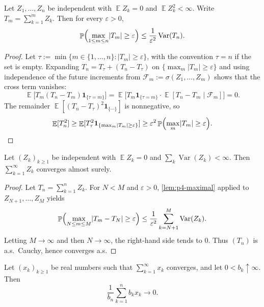 \documentclass[11pt,a4paper]{article}
\DeclareMathOperator{\Var}{Var}
\DeclareMathOperator{\E}{\mathbb{E}}
\DeclareMathOperator{\Pbb}{\mathbb{P}}
\begin{document}
\begin{lemma}
\label{lem:p4-maximal}
Let \(Z_1,\dots,Z_n\) be independent with \(\E Z_k=0\) and \(\E Z_k^2<\infty\). Write \(T_m=\sum_{k=1}^m Z_k\). Then for every \(\varepsilon>0\),
\[
\Pbb\Bigl(\max_{1\le m\le n}\lvert T_m\rvert\ge\varepsilon\Bigr)
\le
\frac{1}{\varepsilon^2}\Var(T_n).
\]
\end{lemma}

\begin{proof}
Let \(\tau:=\min\{m\in\{1,\dots,n\}:\lvert T_m\rvert\ge\varepsilon\}\), with the convention \(\tau=n\) if the set is empty. Expanding \(T_n=T_\tau+(T_n-T_\tau)\) on \(\{\max_m\lvert T_m\rvert\ge\varepsilon\}\) and using independence of the future increments from \(\mathcal{F}_m:=\sigma(Z_1,\dots,Z_m)\) shows that the cross term vanishes:
\[
\E\bigl[T_m(T_n-T_m)\mathbf{1}_{\{\tau=m\}}\bigr]
=
\E\bigl[T_m\mathbf{1}_{\{\tau=m\}}\cdot\E[T_n-T_m\mid\mathcal{F}_m]\bigr]
=
0.
\]
The remainder \(\E[(T_n-T_\tau)^2\mathbf{1}_{\{\cdots\}}]\) is nonnegative, so
\[
\E[T_n^2]
\ge
\E[T_\tau^2\mathbf{1}_{\{\max_m\lvert T_m\rvert\ge\varepsilon\}}]
\ge
\varepsilon^2\Pbb\Bigl(\max_m\lvert T_m\rvert\ge\varepsilon\Bigr).
\]
\end{proof}

\begin{lemma}
\label{lem:p4-kolmogorov}
Let \((Z_k)_{k\ge 1}\) be independent with \(\E Z_k=0\) and \(\sum_k\Var(Z_k)<\infty\). Then \(\sum_{k=1}^\infty Z_k\) converges almost surely.
\end{lemma}

\begin{proof}
Let \(T_n=\sum_{k=1}^n Z_k\). For \(N<M\) and \(\varepsilon>0\), \cref{lem:p4-maximal} applied to \(Z_{N+1},\dots,Z_M\) yields
\[
\Pbb\Bigl(\max_{N\le m\le M}\lvert T_m-T_N\rvert\ge\varepsilon\Bigr)
\le
\frac{1}{\varepsilon^2}\sum_{k=N+1}^M\Var(Z_k).
\]
Letting \(M\to\infty\) and then \(N\to\infty\), the right-hand side tends to \(0\). Thus \((T_n)\) is a.s.\ Cauchy, hence converges a.s.
\end{proof}

\begin{lemma}[Kronecker]
\label{lem:p4-kronecker}
Let \((x_k)_{k\ge 1}\) be real numbers such that \(\sum_{k=1}^\infty x_k\) converges, and let \(0<b_k\uparrow\infty\). Then
\[
\frac{1}{b_n}\sum_{k=1}^n b_k x_k\to 0.
\]
\end{lemma}
\end{document}

